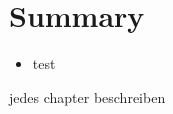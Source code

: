 \section{Summary}\label{section:conclusion-summary}
\begin{itemize}
    \item test
\end{itemize}
jedes chapter beschreiben
